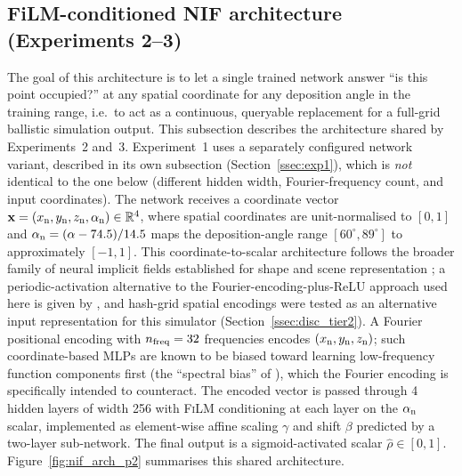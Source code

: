 \documentclass[aip,amsmath,amssymb,reprint]{revtex4-1}
\renewcommand{\ang}{\ensuremath{\alpha}} %
\newcommand{\film}{\textsc{FiLM}}
\begin{document}
\subsection{FiLM-conditioned NIF architecture (Experiments 2--3)}
\label{ssec:arch}

The goal of this architecture is to let a single trained network
answer ``is this point occupied?'' at any spatial coordinate for
any deposition angle in the training range, i.e.\ to act as a
continuous, queryable replacement for a full-grid ballistic
simulation output.
This subsection describes the architecture shared by
Experiments~2 and~3.  Experiment~1 uses a separately configured
network variant, described in its own subsection
(Section~\ref{ssec:exp1}), which is \emph{not} identical to the
one below (different hidden width, Fourier-frequency count, and
input coordinates).
The network receives a coordinate vector
$\mathbf{x} = (x_{\rm n}, y_{\rm n}, z_{\rm n}, \alpha_{\rm n}) \in \mathbb{R}^4$,
where spatial coordinates are unit-normalised to $[0,1]$ and
$\alpha_{\rm n} = (\ang - 74.5)/14.5$ maps the deposition-angle
range $[60^{\circ}, 89^{\circ}]$ to approximately $[-1, 1]$.
This coordinate-to-scalar architecture follows the broader family of
neural implicit fields established for shape and scene representation
\citep{park2019deepsdf,mescheder2019occupancy,mildenhall2020nerf}; a
periodic-activation alternative to the Fourier-encoding-plus-ReLU
approach used here is given by \citet{sitzmann2020siren}, and hash-grid
spatial encodings \citep{muller2022instant} were tested as an alternative
input representation for this simulator (Section~\ref{ssec:disc_tier2}).
A Fourier positional encoding \citep{tancik2020fourier} with
$n_{\rm freq} = 32$ frequencies encodes $(x_{\rm n}, y_{\rm n}, z_{\rm n})$;
such coordinate-based MLPs are known to be biased toward learning
low-frequency function components first (the ``spectral bias'' of
\citet{rahaman2019spectral}), which the Fourier encoding is specifically
intended to counteract.
The encoded vector is passed through 4 hidden layers of width 256
with \film{} conditioning at each layer on the $\alpha_{\rm n}$
scalar, implemented as element-wise affine scaling $\gamma$ and
shift $\beta$ predicted by a two-layer sub-network.
The final output is a sigmoid-activated scalar $\hat{\rho} \in [0,1]$.
Figure~\ref{fig:nif_arch_p2} summarises this shared architecture.
\end{document}
